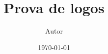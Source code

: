\documentclass{beamer}
\title{Prova de logos}
\author{Autor}
\date{\today}
\begin{document}
\begin{frame}
  \titlepage
\end{frame}
\end{document}
